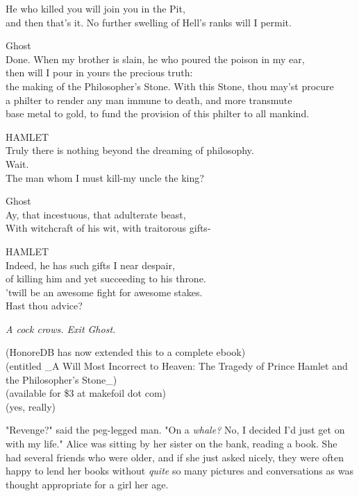 He who killed you will join you in the Pit,\\
and then that's it. No further swelling of Hell's ranks will I permit.

Ghost\\
Done. When my brother is slain, he who poured the poison in my ear,\\
then will I pour in yours the precious truth:\\
the making of the Philosopher's Stone. With this Stone, thou may'st procure\\
a philter to render any man immune to death, and more transmute\\
base metal to gold, to fund the provision of this philter to all mankind.

HAMLET\\
Truly there is nothing beyond the dreaming of philosophy.\\
Wait.\\
The man whom I must kill-my uncle the king?

Ghost\\
Ay, that incestuous, that adulterate beast,\\
With witchcraft of his wit, with traitorous gifts-

HAMLET\\
Indeed, he has such gifts I near despair,\\
of killing him and yet succeeding to his throne.\\
'twill be an awesome fight for awesome stakes.\\
Hast thou advice?

\emph{A cock crows. Exit Ghost.}

\begin{center}
(HonoreDB has now extended this to a complete ebook)\\
(entitled \_A Will Most Incorrect to Heaven: The Tragedy of Prince Hamlet and 
the Philosopher's Stone\_)\\
(available for \$3 at makefoil dot com)\\
(yes, really)
\end{center}
\sbreak
"Revenge?" said the peg-legged man. "On a \emph{whale?} No, I decided I'd just 
get on with my life."
\sbreak
Alice was sitting by her sister on the bank, reading a book. She had several 
friends who were older, and if she just asked nicely, they were often happy to 
lend her books without \emph{quite} so many pictures and conversations as was 
thought appropriate for a girl her age.

